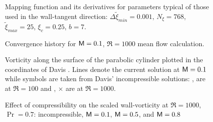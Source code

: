 %
\begin{figure}[p]
\centering
\setvlabel{$\tilde\xi$}
\epsfxsize=4in 
\setvlabel{$\tilde\xi_{,\xi}$}
\epsfxsize=4in 
\sethlabel{$\xi$}
\setvlabel{$\tilde\xi_{,\xi\xi}$}
\epsfxsize=4in 
\caption [Mapping function and its derivatives for parameters typical of those
used in the wall-tangent direction]{Mapping function and its derivatives for
parameters typical of those used in the wall-tangent direction:
$\Delta\tilde\xi_{min}=0.001$, $N_\xi = 768$, $\tilde\xi_{max}=25$,
$\xi_c=0.25$, $b=7$.
\label{f:map}}
\end{figure}
%
%
%
%
\begin{figure}[p]
\centering
{}
\epsfxsize=5.4in 
\caption {Convergence history for ${\sf M}=0.1$, $\Re=1000$ mean flow calculation.
\label{f:conv}}
\end{figure}
%
%
\begin{figure}[p]
\centering
{}
\epsfxsize=5.4in 
\caption [Vorticity along the surface of the parabolic cylinder plotted in the
coordinates of Davis \protect\cite{Davis:72}.]{Vorticity along the surface of
the parabolic cylinder plotted in the coordinates of Davis
\protect\cite{Davis:72}.  Lines denote the current solution at ${\sf M}=0.1$ while
symbols are taken from Davis' incompressible solutions: \solid, \scircle are
at $\Re=100$ and \dotted, $\times$ are at $\Re=1000$. \label{f:davis}}
\end{figure}
%
\clearpage
%
%
\begin{figure}[p]
\centering
{}
\epsfxsize=5.4in 
\caption [Effect of compressibility on the scaled wall-vorticity]{Effect of
compressibility on the scaled wall-vorticity at $\Re=1000$, $\Pr = 0.7$:
\scircle incompressible, \solid ${\sf M}=0.1$, \dashed ${\sf M}=0.5$, and \dotted
${\sf M}=0.8$
\label{f:mach} }
\end{figure}
